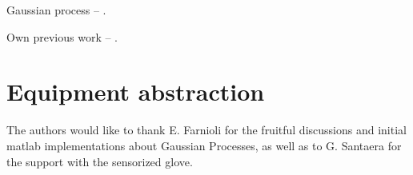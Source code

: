 \documentclass[twocolumn,draft,natbib]{svjour3}
\begin{document}
Gaussian process -- \citet{Rasmussen2006Gaussian}.

Own previous work -- \citet{Rosales2014Active}.

\section{Equipment abstraction}
\label{sec:equipment}

\begin{acknowledgements}
The authors would like to thank E. Farnioli for the fruitful discussions and 
initial matlab implementations about Gaussian Processes, as well as to G. 
Santaera for the support with the sensorized glove.
\end{acknowledgements}



\end{document}
